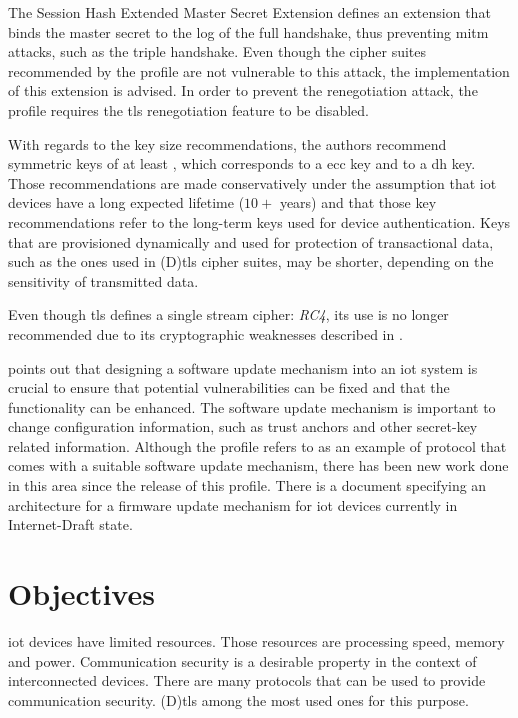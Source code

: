 \documentclass{llncs}
\begin{document}
The Session Hash Extended Master Secret Extension\cite{RFC7627} defines an extension
that binds the master secret to the log of the full handshake, thus preventing
\gls{mitm} attacks, such as the triple handshake\cite{TripleHa89:online}. Even though the
cipher suites recommended by the profile are not vulnerable to this attack, the
implementation of this extension is advised. In order to prevent the renegotiation
attack\cite{RFC5746}, the profile requires the \gls{tls} renegotiation feature
to be disabled.

With regards to the key size recommendations, the authors recommend symmetric keys
of at least , which corresponds to a  \gls{ecc}
key and to a  \gls{dh} key. Those recommendations are made
conservatively under the assumption that \gls{iot} devices have a long expected
lifetime ($10+$ years) and that those key recommendations refer to the long-term
keys used for device authentication. Keys that are provisioned dynamically
and used for protection of transactional data, such as the ones used in
(D)\gls{tls} cipher suites, may be shorter, depending on the sensitivity of
transmitted data.

Even though \gls{tls} defines a single stream cipher: \textit{RC4}, its use is no longer
recommended due to its cryptographic weaknesses described in \cite{RFC7465}.

\cite{RFC7925} points out that designing a software
update mechanism into an \gls{iot} system is crucial to ensure that potential vulnerabilities
can be fixed and that the functionality can be enhanced. The software update mechanism
is important to change configuration information, such as trust anchors and
other secret-key related information. Although the profile refers to \cite{OpenMobi29:online}
as an example of protocol that comes with a suitable software update mechanism,
there has been new work done in this area since the release of this profile.
There is a document specifying an architecture for a firmware update
mechanism for \gls{iot} devices\cite{I-D.moran-suit-architecture} currently in Internet-Draft state.

\section{Objectives}

\gls{iot} devices have limited resources. Those resources are processing speed, memory and power.
Communication security is a desirable property in the context of interconnected devices.
There are many protocols that can be used to provide communication security. (D)\gls{tls} among the
most used ones for this purpose.
\end{document}
